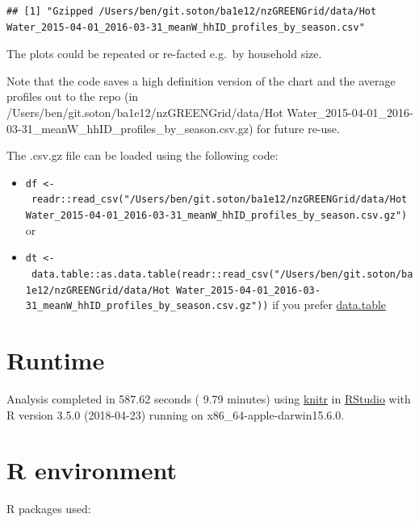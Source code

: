 \documentclass[]{article}
\providecommand{\tightlist}{%
  \setlength{\itemsep}{0pt}\setlength{\parskip}{0pt}}
\begin{document}
\begin{verbatim}
## [1] "Gzipped /Users/ben/git.soton/ba1e12/nzGREENGrid/data/Hot Water_2015-04-01_2016-03-31_meanW_hhID_profiles_by_season.csv"
\end{verbatim}

The plots could be repeated or re-facted e.g.~by household size.

Note that the code saves a high definition version of the chart and the
average profiles out to the repo (in
/Users/ben/git.soton/ba1e12/nzGREENGrid/data/Hot
Water\_2015-04-01\_2016-03-31\_meanW\_hhID\_profiles\_by\_season.csv.gz)
for future re-use.

The .csv.gz file can be loaded using the following code:

\begin{itemize}
\tightlist
\item
  \texttt{df\ \textless{}-\ readr::read\_csv("/Users/ben/git.soton/ba1e12/nzGREENGrid/data/Hot\ Water\_2015-04-01\_2016-03-31\_meanW\_hhID\_profiles\_by\_season.csv.gz")}
  or
\item
  \texttt{dt\ \textless{}-\ data.table::as.data.table(readr::read\_csv("/Users/ben/git.soton/ba1e12/nzGREENGrid/data/Hot\ Water\_2015-04-01\_2016-03-31\_meanW\_hhID\_profiles\_by\_season.csv.gz"))}
  if you prefer \href{}{data.table}
\end{itemize}

\section{Runtime}\label{runtime}

Analysis completed in 587.62 seconds ( 9.79 minutes) using
\href{https://cran.r-project.org/package=knitr}{knitr} in
\href{http://www.rstudio.com}{RStudio} with R version 3.5.0 (2018-04-23)
running on x86\_64-apple-darwin15.6.0.

\section{R environment}\label{r-environment}

R packages used:
\end{document}
